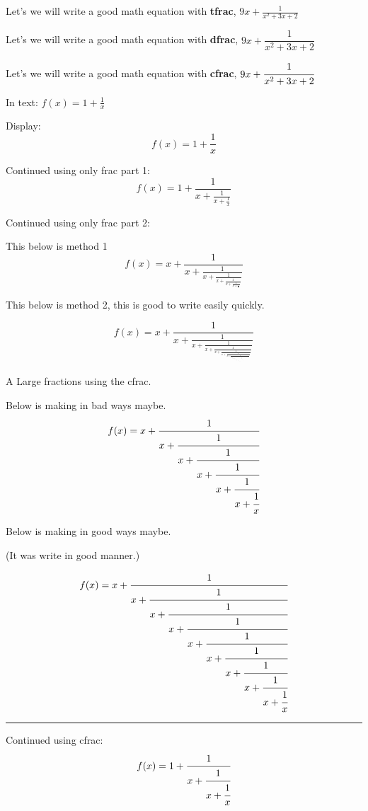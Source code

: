 \documentclass[12pt, letterpaper]{article}
\begin{document}
Let's we will write a good math equation with \textbf{tfrac}, $9x + \tfrac{1}{x^2+3x + 2}$

Let's we will write a good math equation with \textbf{dfrac}, $9x + \dfrac{1}{x^2+3x + 2}$

Let's we will write a good math equation with \textbf{cfrac}, $9x + \cfrac{1}{x^2+3x + 2}$




In text: \( f(x) = 1 + \tfrac{1}{x} \)

Display:
\[
f(x) = 1 + \dfrac{1}{x}
\]



Continued using only frac part 1:
\[
f(x) = 1 + \frac{1}{x + \frac{1}{x + \frac{1}{x}}}
\]


Continued using only frac part 2:

This below is method  1
\[
    f(x) = x + \frac{1}{x + \frac{1}{x + \frac{1}{x + \frac{1}{x + \frac{1}{x + \frac{1}{x}}}}}}
    \]
    

This below is method  2, this is good to write easily quickly.

\[
f(x) = x + \frac{1}{x + 
         \frac{1}{x + 
         \frac{1}{x + 
         \frac{1}{x + 
         \frac{1}{x + 
         \frac{1}{x + 
         \frac{1}{x + 
         \frac{1}{x + 
         \frac{1}{x + 
         \frac{1}{x + 
         \frac{1}{x + 
         \frac{1}{x + 
         \frac{1}{x + 
         \frac{1}{x + 
         \frac{1}{x
         }}}}}}}}}}}}}}}
\]





\newpage

A Large fractions using the cfrac.

Below is making in bad ways maybe.
\[
    f(x) = x + \cfrac{1}{x + \cfrac{1}{x + \cfrac{1}{x + \cfrac{1}{x + \cfrac{1}{x + \cfrac{1}{x}}}}}}
\]
    
Below is making in good ways maybe.

(It was write in good manner.)

\[
f(x) = x + \cfrac{1}{x + 
          \cfrac{1}{x + 
          \cfrac{1}{x + 
          \cfrac{1}{x + 
          \cfrac{1}{x + 
          \cfrac{1}{x + 
          \cfrac{1}{x + 
          \cfrac{1}{x + 
          \cfrac{1}{x
          }}}}}}}}}
\]


\noindent\rule{\linewidth}{5pt}



Continued using cfrac:
\[
f(x) = 1 + \cfrac{1}{x + \cfrac{1}{x + \cfrac{1}{x}}}
\]
\end{document}
